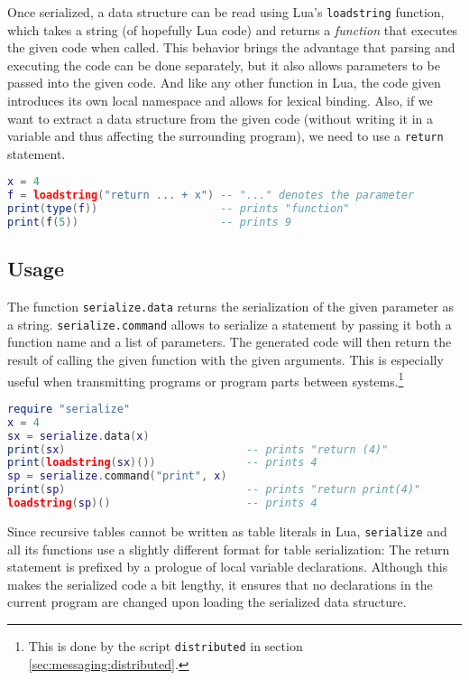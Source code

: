 Once serialized, a data structure can be read using Lua's \texttt{loadstring} function, which takes a string (of hopefully Lua code) and returns a \emph{function} that executes the given code when called. This behavior brings the advantage that parsing and executing the code can be done separately, but it also allows parameters to be passed into the given code. And like any other function in Lua, the code given introduces its own local namespace and allows for lexical binding. Also, if we want to extract a data structure from the given code (without writing it in a variable and thus affecting the surrounding program), we need to use a \texttt{return} statement.

\begin{lstlisting}[language=lua, caption={Using Lua's \texttt{loadstring} function}, label=lst:loadstring, name=lst:loadstring]
x = 4
f = loadstring("return ... + x") -- "..." denotes the parameter
print(type(f))                   -- prints "function"
print(f(5))                      -- prints 9
\end{lstlisting}

\subsection{Usage}

The function \texttt{serialize.data} returns the serialization of the given parameter as a string. \texttt{serialize.command} allows to serialize a statement by passing it both a function name and a list of parameters. The generated code will then return the result of calling the given function with the given arguments. This is especially useful when transmitting programs or program parts between systems.\footnote{This is done by the script \texttt{distributed} in section \ref{sec:messaging:distributed}.}

\begin{lstlisting}[language=lua, caption={Using \texttt{serialize.data} and \texttt{serialize.command}}, label=lst:serializedatacommand, name=lst:serializedatacommand]
require "serialize"
x = 4
sx = serialize.data(x)
print(sx)                            -- prints "return (4)"
print(loadstring(sx)())              -- prints 4
sp = serialize.command("print", x)
print(sp)                            -- prints "return print(4)"
loadstring(sp)()                     -- prints 4
\end{lstlisting}

Since recursive tables cannot be written as table literals in Lua, \texttt{serialize} and all its functions use a slightly different format for table serialization: The return statement is prefixed by a prologue of local variable declarations. Although this makes the serialized code a bit lengthy, it ensures that no declarations in the current program are changed upon loading the serialized data structure.

